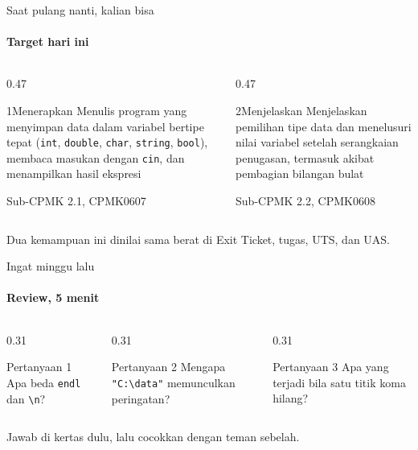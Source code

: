 \documentclass[t]{beamer}
\begin{document}
\begin{frame}{Saat pulang nanti, kalian bisa}
\framesubtitle{Target hari ini}
\begin{columns}[T]
\begin{column}{0.47\textwidth}
\begin{Langkah}{1}{Menerapkan}
Menulis program yang menyimpan data dalam variabel bertipe tepat (\texttt{int}, \texttt{double}, \texttt{char}, \texttt{string}, \texttt{bool}), membaca masukan dengan \texttt{cin}, dan menampilkan hasil ekspresi

{\footnotesize\color{ITERAInkMuted}Sub-CPMK 2.1, CPMK0607}
\end{Langkah}
\end{column}
\begin{column}{0.47\textwidth}
\begin{Langkah}{2}{Menjelaskan}
Menjelaskan pemilihan tipe data dan menelusuri nilai variabel setelah serangkaian penugasan, termasuk akibat pembagian bilangan bulat

{\footnotesize\color{ITERAInkMuted}Sub-CPMK 2.2, CPMK0608}
\end{Langkah}
\end{column}
\end{columns}
\vspace{8pt}
\begin{Catatan}
Dua kemampuan ini dinilai sama berat di Exit Ticket, tugas, UTS, dan UAS.
\end{Catatan}
\end{frame}

\begin{frame}{Ingat minggu lalu}
\framesubtitle{Review, 5 menit}
\begin{columns}[T]
\begin{column}{0.31\textwidth}
\begin{BlokGelap}{Pertanyaan 1}
Apa beda \texttt{endl} dan \texttt{\textbackslash{}n}?
\end{BlokGelap}
\end{column}
\begin{column}{0.31\textwidth}
\begin{BlokGelap}{Pertanyaan 2}
Mengapa \texttt{"C:\textbackslash{}data"} memunculkan peringatan?
\end{BlokGelap}
\end{column}
\begin{column}{0.31\textwidth}
\begin{BlokGelap}{Pertanyaan 3}
Apa yang terjadi bila satu titik koma hilang?
\end{BlokGelap}
\end{column}
\end{columns}
\vspace{8pt}
Jawab di kertas dulu, lalu cocokkan dengan teman sebelah.
\end{frame}
\end{document}
